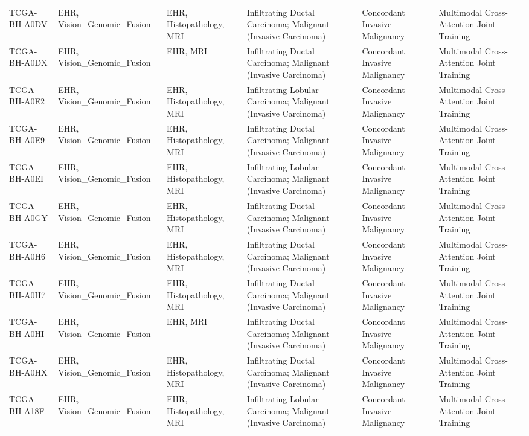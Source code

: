 \begin{table}
\begin{tabular}{llllll}
TCGA-BH-A0DV & EHR, Vision\_Genomic\_Fusion & EHR, Histopathology, MRI & Infiltrating Ductal Carcinoma; Malignant (Invasive Carcinoma) & Concordant Invasive Malignancy & Multimodal Cross-Attention Joint Training \\
TCGA-BH-A0DX & EHR, Vision\_Genomic\_Fusion & EHR, MRI & Infiltrating Ductal Carcinoma; Malignant (Invasive Carcinoma) & Concordant Invasive Malignancy & Multimodal Cross-Attention Joint Training \\
TCGA-BH-A0E2 & EHR, Vision\_Genomic\_Fusion & EHR, Histopathology, MRI & Infiltrating Lobular Carcinoma; Malignant (Invasive Carcinoma) & Concordant Invasive Malignancy & Multimodal Cross-Attention Joint Training \\
TCGA-BH-A0E9 & EHR, Vision\_Genomic\_Fusion & EHR, Histopathology, MRI & Infiltrating Ductal Carcinoma; Malignant (Invasive Carcinoma) & Concordant Invasive Malignancy & Multimodal Cross-Attention Joint Training \\
TCGA-BH-A0EI & EHR, Vision\_Genomic\_Fusion & EHR, Histopathology, MRI & Infiltrating Lobular Carcinoma; Malignant (Invasive Carcinoma) & Concordant Invasive Malignancy & Multimodal Cross-Attention Joint Training \\
TCGA-BH-A0GY & EHR, Vision\_Genomic\_Fusion & EHR, Histopathology, MRI & Infiltrating Ductal Carcinoma; Malignant (Invasive Carcinoma) & Concordant Invasive Malignancy & Multimodal Cross-Attention Joint Training \\
TCGA-BH-A0H6 & EHR, Vision\_Genomic\_Fusion & EHR, Histopathology, MRI & Infiltrating Ductal Carcinoma; Malignant (Invasive Carcinoma) & Concordant Invasive Malignancy & Multimodal Cross-Attention Joint Training \\
TCGA-BH-A0H7 & EHR, Vision\_Genomic\_Fusion & EHR, Histopathology, MRI & Infiltrating Ductal Carcinoma; Malignant (Invasive Carcinoma) & Concordant Invasive Malignancy & Multimodal Cross-Attention Joint Training \\
TCGA-BH-A0HI & EHR, Vision\_Genomic\_Fusion & EHR, MRI & Infiltrating Ductal Carcinoma; Malignant (Invasive Carcinoma) & Concordant Invasive Malignancy & Multimodal Cross-Attention Joint Training \\
TCGA-BH-A0HX & EHR, Vision\_Genomic\_Fusion & EHR, Histopathology, MRI & Infiltrating Ductal Carcinoma; Malignant (Invasive Carcinoma) & Concordant Invasive Malignancy & Multimodal Cross-Attention Joint Training \\
TCGA-BH-A18F & EHR, Vision\_Genomic\_Fusion & EHR, Histopathology, MRI & Infiltrating Lobular Carcinoma; Malignant (Invasive Carcinoma) & Concordant Invasive Malignancy & Multimodal Cross-Attention Joint Training \\

\end{tabular}
\end{table}
